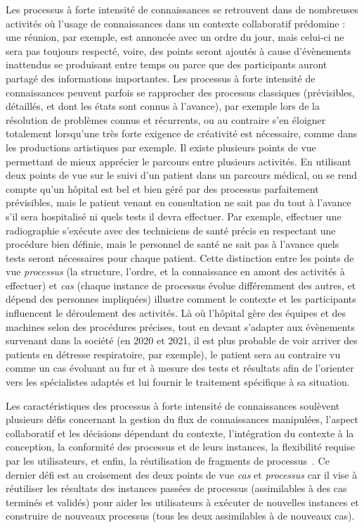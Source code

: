 \bigskip

Les processus à forte intensité de connaissances se retrouvent dans de nombreuses activités où l'usage de connaissances dans un contexte collaboratif prédomine : une réunion, par exemple, est annoncée avec un ordre du jour, mais celui-ci ne sera pas toujours respecté, voire, des points seront ajoutés à cause d'évènements inattendus se produisant entre temps ou parce que des participants auront partagé des informations importantes.
Les processus à forte intensité de connaissances peuvent parfois se rapprocher des processus classiques (prévisibles, détaillés, et dont les états sont connus à l'avance), par exemple lors de la résolution de problèmes connus et récurrents, ou au contraire s'en éloigner totalement lorsqu'une très forte exigence de créativité est nécessaire, comme dans les productions artistiques par exemple.
Il existe plusieurs points de vue permettant de mieux apprécier le parcours entre plusieurs activités.
En utilisant deux points de vue sur le suivi d'un patient dans un parcours médical, on se rend compte qu'un hôpital est bel et bien géré par des processus parfaitement prévisibles, mais le patient venant en consultation ne sait pas du tout à l'avance s'il sera hospitalisé ni quels tests il devra effectuer.
Par exemple, effectuer une radiographie s'exécute avec des techniciens de santé précis en respectant une procédure bien définie, mais le personnel de santé ne sait pas à l'avance quels tests seront nécessaires pour chaque patient.
Cette distinction entre les points de vue \textit{processus} (la structure, l'ordre, et la connaissance en amont des activités à effectuer) et \textit{cas} (chaque instance de processus évolue différemment des autres, et dépend des personnes impliquées) illustre comment le contexte et les participants influencent le déroulement des activités.
Là où l'hôpital gère des équipes et des machines selon des procédures précises, tout en devant s'adapter aux évènements survenant dans la société (en 2020 et 2021, il est plus probable de voir arriver des patients en détresse respiratoire, par exemple), le patient sera au contraire vu comme un cas évoluant au fur et à mesure des tests et résultats afin de l'orienter vers les spécialistes adaptés et lui fournir le traitement spécifique à sa situation.

\bigskip

Les caractéristiques des processus à forte intensité de connaissances soulèvent plusieurs défis concernant la gestion du flux de connaissances manipulées, l'aspect collaboratif et les décisions dépendant du contexte, l'intégration du contexte à la conception, la conformité des processus et de leurs instances, la flexibilité requise par les utilisateurs, et enfin, la réutilisation de fragments de processus~\cite{boissier2019challenges}.
Ce dernier défi est au croisement des deux points de vue \textit{cas} et \textit{processus} car il vise à réutiliser les résultats des instances passées de processus (assimilables à des cas terminés et validés) pour aider les utilisateurs à exécuter de nouvelles instances et construire de nouveaux processus (tous les deux assimilables à de nouveaux cas).

